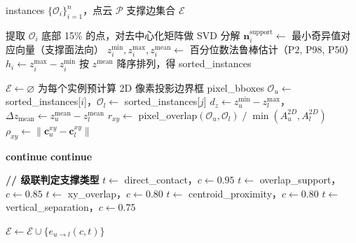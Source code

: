 \documentclass[12pt,a4paper]{article}
\begin{document}
\begin{algorithm}[htbp]
\caption{阶段一：几何感知的支撑边构建}
\label{alg:phase1}
\begin{algorithmic}[1]
\Require instances $\{\mathcal{O}_i\}_{i=1}^{n}$，点云 $\mathcal{P}$
\Ensure 支撑边集合 $\mathcal{E}$

    \State 提取 $\mathcal{O}_i$ 底部 15\% 的点，对去中心化矩阵做 SVD 分解
    \State $\mathbf{n}_i^{\text{support}} \gets$ 最小奇异值对应向量（支撑面法向）
    \State $z_i^{\min}, z_i^{\max}, z_i^{\text{mean}} \gets$ 百分位数法鲁棒估计（P2, P98, P50）
    \State $h_i \gets z_i^{\max} - z_i^{\min}$
\EndFor
\State 按 $z^{\text{mean}}$ 降序排列，得 sorted\_instances

\State $\mathcal{E} \gets \varnothing$
\State 为每个实例预计算 2D 像素投影边界框 pixel\_bboxes
        \State $\mathcal{O}_u \gets$ sorted\_instances[$i$]，$\mathcal{O}_l \gets$ sorted\_instances[$j$]
        \State $d_z \gets z_u^{\min} - z_l^{\max}$，$\Delta z_{\text{mean}} \gets z_u^{\text{mean}} - z_l^{\text{mean}}$
        \State $r_{xy} \gets$ pixel\_overlap$(\mathcal{O}_u, \mathcal{O}_l) \;/\; \min(A_u^{2D}, A_l^{2D})$
        \State $\rho_{xy} \gets \lVert \mathbf{c}_u^{xy} - \mathbf{c}_l^{xy} \rVert$

            \State \textbf{continue} 
        \EndIf
            \State \textbf{continue} 
        \EndIf

        \State \textbf{// 级联判定支撑类型}
            \State $t \gets$ direct\_contact，$c \gets 0.95$
            \State $t \gets$ overlap\_support，$c \gets 0.85$
            \State $t \gets$ xy\_overlap，$c \gets 0.80$
            \State $t \gets$ centroid\_proximity，$c \gets 0.80$
        \Else
            \State $t \gets$ vertical\_separation，$c \gets 0.75$
        \EndIf

            \State $\mathcal{E} \gets \mathcal{E} \cup \{e_{u \to l}(c, t)\}$
        \EndIf
    \EndFor
\EndFor


\end{algorithmic}
\end{algorithm}
\end{document}
